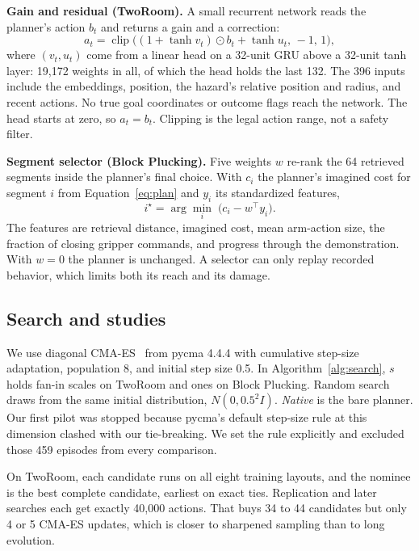 \documentclass[dvipsnames,format=sigconf]{acmart}
\newcommand{\cmaes}{CMA-ES}
\begin{document}
\textbf{Gain and residual (TwoRoom).} A small recurrent network reads the planner's action $b_t$ and
returns a gain and a correction:
\begin{equation}
  a_t = \operatorname{clip}\bigl((1+\tanh v_t)\odot b_t + \tanh u_t,\,-1,\,1\bigr),
  \label{eq:gain}
\end{equation}
where $(v_t,u_t)$ come from a linear head on a 32-unit GRU above a 32-unit tanh layer: 19,172 weights
in all, of which the head holds the last 132. The 396 inputs include the embeddings, position, the
hazard's relative position and radius, and recent actions. %
No true goal coordinates or outcome flags reach the network. The head starts at zero, so
$a_t=b_t$. Clipping is the legal action range, not a safety filter.

\textbf{Segment selector (Block Plucking).} Five weights $w$ re-rank the 64 retrieved segments inside
the planner's final choice. With $c_i$ the planner's imagined cost for segment $i$ from
Equation~\ref{eq:plan} and $y_i$ its standardized features,
\begin{equation}
  i^\star = \arg\min_{i}\;\bigl(c_i - w^{\top} y_i\bigr).
  \label{eq:select}
\end{equation}
The features are retrieval distance, imagined cost, mean arm-action size, the fraction of closing
gripper commands, and progress through the demonstration. With $w=0$ the planner is unchanged. A
selector can only replay recorded behavior, which limits both its reach and its damage.

\subsection{Search and studies}

We use diagonal \cmaes{}~\cite{ros2008simple} from pycma 4.4.4 with cumulative step-size adaptation,
population 8, and initial step size 0.5. In Algorithm~\ref{alg:search}, $s$ holds fan-in scales on
TwoRoom and ones on Block Plucking. Random search draws from the same initial distribution,
$N(0,0.5^2 I)$. \emph{Native} is the bare planner. Our first pilot was stopped because pycma's default
step-size rule at this dimension clashed with our tie-breaking. We set the rule explicitly and
excluded those 459 episodes from every comparison. %

On TwoRoom, each candidate runs on all eight training layouts, and the nominee is the best complete
candidate, earliest on exact ties. Replication and later searches each get exactly 40,000 actions.
That buys 34 to 44 candidates but only 4 or 5 \cmaes{} updates, which is closer to sharpened sampling
than to long evolution.
\end{document}
